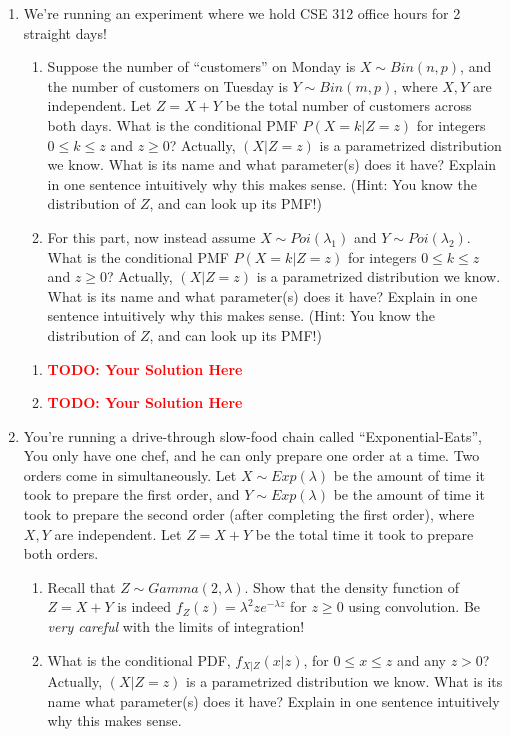 \documentclass[12pt]{article}
\def\todo#1{\textcolor{red}{\textbf{#1}}}
\renewcommand{\|}{\mid}
\begin{document}
\begin{enumerate}


\item We're running an experiment where we hold CSE 312 office hours for 2 straight days!
\begin{enumerate}
    \item  Suppose the number of ``customers'' on Monday is $X\sim Bin(n,p)$, and the number of customers on Tuesday is $Y\sim Bin(m,p)$, where $X,Y$ are independent. Let $Z=X+Y$ be the total number of customers across both days. What is the conditional PMF $P(X=k|Z=z)$ for integers $0\le k\le z$ and $z\ge 0$? Actually, $(X|Z=z)$ is a parametrized distribution we know. What is its name and what parameter(s) does it have? Explain in one sentence intuitively why this makes sense.  (Hint: You know the distribution of $Z$, and can look up its PMF!)
    \item For this part, now instead assume $X\sim Poi(\lambda_1)$ and $Y\sim Poi(\lambda_2)$. What is the conditional PMF $P(X=k|Z=z)$ for integers $0\le k\le z$ and $z\ge 0$? Actually, $(X|Z=z)$ is a parametrized distribution we know. What is its name and what parameter(s) does it have? Explain in one sentence intuitively why this makes sense. (Hint: You know the distribution of $Z$, and can look up its PMF!)
\end{enumerate}

\begin{tcolorbox}
\begin{enumerate}
\item \todo{TODO: Your Solution Here}
\item \todo{TODO: Your Solution Here}
\end{enumerate}
\end{tcolorbox}

\item You're running a drive-through slow-food chain called ``Exponential-Eats'',  You only have one chef, and he can only prepare one order at a time. Two orders come in simultaneously. Let $X\sim Exp(\lambda)$ be the amount of time it took to prepare the first order, and $Y\sim Exp(\lambda)$ be the amount of time it took to prepare the second order (after completing the first order), where $X,Y$ are independent. Let $Z=X+Y$ be the total time it took to prepare both orders. 
\begin{enumerate}
    \item Recall that $Z\sim Gamma(2,\lambda)$. Show that the density function of $Z=X+Y$ is indeed $f_Z(z)=\lambda^2 ze^{-\lambda z}$ for $z\ge 0$ using convolution.  Be \textit{very careful} with the limits of integration!
    \item What is the conditional PDF, $f_{X|Z}(x|z)$, for $0\le x\le z$ and any $z>0$? Actually, $(X|Z=z)$ is a parametrized distribution we know. What is its name what parameter(s) does it have? Explain in one sentence intuitively why this makes sense.
\end{enumerate}


\end{enumerate}
\end{document}

